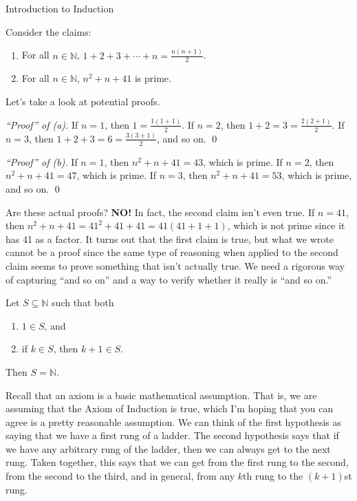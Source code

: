 \begin{section}{Introduction to Induction}

Consider the claims:
\begin{enumerate}[label=\textrm{(\alph*)}]
\item For all $n\in\mathbb{N}$, $\displaystyle 1+2+3+\cdots +n=\frac{n(n+1)}{2}$.
\item For all $n\in\mathbb{N}$, $n^{2}+n+41$ is prime.
\end{enumerate}
Let's take a look at potential proofs.

\bigskip

\noindent \emph{``Proof'' of (a).} If $n=1$, then $1=\frac{1(1+1)}{2}$.  If $n=2$, then $1+2=3=\frac{2(2+1)}{2}$.  If $n=3$, then $1+2+3=6=\frac{3(3+1)}{2}$, and so on. \hfill \qed

\bigskip

\noindent \emph{``Proof'' of (b).} If $n=1$, then $n^{2}+n+41=43$, which is prime.  If $n=2$, then $n^{2}+n+41=47$, which is prime.  If $n=3$, then $n^{2}+n+41=53$, which is prime, and so on. \hfill \qed

\bigskip

Are these actual proofs?  \textbf{NO!}  In fact, the second claim isn't even true.  If $n=41$, then $n^{2}+n+41=41^{2}+41+41=41(41+1+1)$, which is not prime since it has 41 as a factor.  It turns out that the first claim is true, but what we wrote cannot be a proof since the same type of reasoning when applied to the second claim seems to prove something that isn't actually true.  We need a rigorous way of capturing ``and so on'' and a way to verify whether it really is ``and so on.''

\begin{axiom}
Let $S\subseteq \mathbb{N}$ such that both
\begin{enumerate}[label=\textrm{(\roman*)}]
\item $1\in S$, and
\item if $k\in S$, then $k+1\in S$.
\end{enumerate}
Then $S=\mathbb{N}$.
\end{axiom}

Recall that an axiom is a basic mathematical assumption.  That is, we are assuming that the Axiom of Induction is true, which I'm hoping that you can agree is a pretty reasonable assumption.  We can think of the first hypothesis as saying that we have a first rung of a ladder.  The second hypothesis says that if we have any arbitrary rung of the ladder, then we can always get to the next rung.  Taken together, this says that we can get from the first rung to the second, from the second to the third, and in general, from any $k$th rung to the $(k+1)$st rung.


\end{section}
